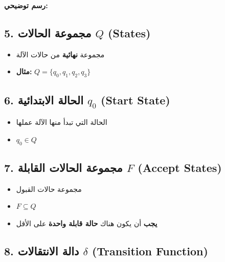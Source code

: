 \documentclass[14pt]{extarticle}
\begin{document}
\textbf{رسم توضيحي:}
\begin{center}
\end{center}

\subsection{5. مجموعة الحالات $Q$ (\textenglish{States})}

\begin{itemize}
    \item مجموعة \textbf{نهائية} من حالات الآلة
    \item \textbf{مثال:} $Q = \{q_0, q_1, q_2, q_3\}$
\end{itemize}

\subsection{6. الحالة الابتدائية $q_0$ (\textenglish{Start State})}

\begin{itemize}
    \item الحالة التي تبدأ منها الآلة عملها
    \item $q_0 \in Q$
\end{itemize}

\subsection{7. مجموعة الحالات القابلة $F$ (\textenglish{Accept States})}

\begin{itemize}
    \item مجموعة حالات القبول
    \item $F \subseteq Q$
    \item \textbf{يجب} أن يكون هناك \textbf{حالة قابلة واحدة} على الأقل
\end{itemize}

\subsection{8. دالة الانتقالات $\delta$ (\textenglish{Transition Function})}
\end{document}
